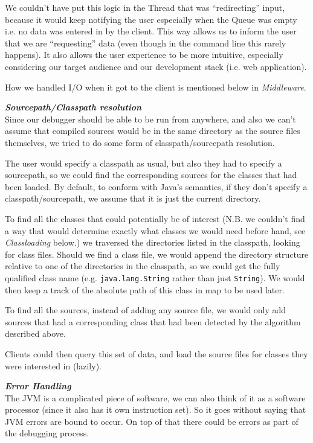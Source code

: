 \documentclass[11pt, a4paper]{article}
\begin{document}
We couldn't have put this logic in the Thread that was ``redirecting'' input, because it would keep notifying the user especially when the Queue was empty i.e. no data was entered in by the client.
This way allows us to inform the user that we are ``requesting'' data (even though in the command line this rarely happens).
It also allows the user experience to be more intuitive, especially considering our target audience and our development stack (i.e. web application).

How we handled I/O when it got to the client is mentioned below in \emph{Middleware}.


\textbf{\emph{Sourcepath/Classpath resolution}}\\
Since our debugger should be able to be run from anywhere, and also we can't assume that compiled sources would be in the same directory as the source files themselves, we tried to do some form of classpath/sourcepath resolution.

The user would specify a classpath as usual, but also they had to specify a sourcepath, so we could find the corresponding sources for the classes that had been loaded.
By default, to conform with Java's semantics, if they don't specify a classpath/sourcepath, we assume that it is just the current directory.

To find all the classes that could potentially be of interest (N.B. we couldn't find a way that would  determine exactly what classes we would need before hand, see \emph{Classloading} below.) we traversed the directories listed in the classpath, looking for class files.
Should we find a class file, we would append the directory structure relative to one of the directories in the classpath, so we could get the fully qualified class name (e.g. \texttt{java.lang.String} rather than just \texttt{String}).
We would then keep a track of the absolute path of this class in map to be used later.

To find all the sources, instead of adding any source file, we would only add sources that had a corresponding class that had been detected by the algorithm described above.

Clients could then query this set of data, and load the source files for classes they were interested in (lazily).

\textbf{\emph{Error Handling}}\\
The JVM is a complicated piece of software, we can also think of it as a software processor (since it also has it own instruction set).
So it goes without saying that JVM errors are bound to occur.
On top of that there could be errors as part of the debugging process.
\end{document}
